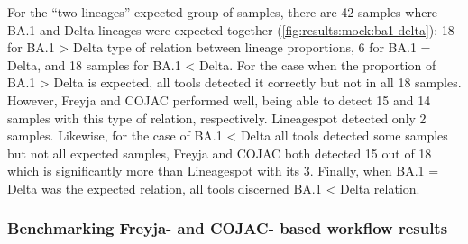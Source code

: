                 For the “two lineages” expected group of samples, there are 42 samples where BA.1 and Delta lineages were expected together (\cref{fig:results:mock:ba1-delta}): 18 for BA.1 > Delta type of relation between lineage proportions, 6 for BA.1 = Delta, and 18 samples for BA.1 < Delta. For the case when the proportion of BA.1 > Delta is expected, all tools detected it correctly but not in all 18 samples. However, Freyja and COJAC performed well, being able to detect 15 and 14 samples with this type of relation, respectively. Lineagespot detected only 2 samples. Likewise, for the case of BA.1 < Delta all tools detected some samples but not all expected samples, Freyja and COJAC both detected 15 out of 18 which is significantly more than Lineagespot with its 3. Finally, when BA.1 = Delta was the expected relation, all tools discerned BA.1 < Delta relation.

        \subsubsection{Benchmarking Freyja- and COJAC- based workflow results}
